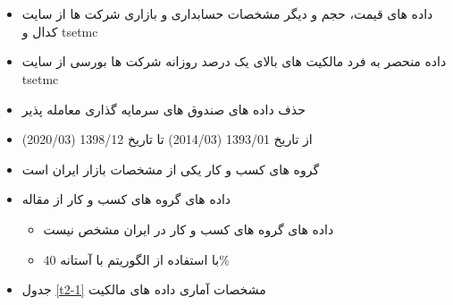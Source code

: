 \documentclass[12pt, a4paper]{article}
\begin{document}
\section{}



\subsection{}
\begin{itemize}
	\item 
	داده های قیمت، حجم و دیگر مشخصات حسابداری و بازاری شرکت ها از سایت کدال و tsetmc
	\item
	داده منحصر به فرد مالکیت های بالای یک درصد روزانه شرکت ها بورسی از سایت 
	tsetmc
	\item 
	حذف داده های صندوق های سرمایه گذاری معامله پذیر
	\item 
	از تاریخ 
	1393/01 (2014/03)
	 تا تاریخ 
	 1398/12 (2020/03)
	 

	\item 
	گروه های کسب و کار یکی از مشخصات بازار ایران است
		\item 
	داده های گروه های کسب و کار از مقاله
	\begin{itemize}
		\item 
		داده های گروه های کسب و کار در ایران مشخص نیست
		\item
		با استفاده از الگوریتم 
		با آستانه 40\%
		
	\end{itemize}
	\item
	جدول 
	\ref{t2-1}
	مشخصات آماری داده های مالکیت
\end{itemize}


\begin{LTR}
\end{LTR}
\end{document}
